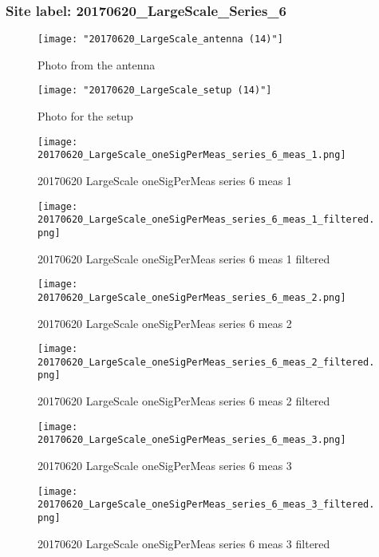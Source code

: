 \subsubsection{Site label: 20170620\_LargeScale\_Series\_6}
\begin{figure}[ht] \caption{Photo from the antenna}
\texttt{[image: "20170620\_LargeScale\_antenna (14)"]}\centering\end{figure}
\begin{figure}[ht] \caption{Photo for the setup}
\texttt{[image: "20170620\_LargeScale\_setup (14)"]}\centering\end{figure}
\begin{figure}[ht] \caption{20170620 LargeScale oneSigPerMeas series 6 meas 1}
\texttt{[image: 20170620\_LargeScale\_oneSigPerMeas\_series\_6\_meas\_1.png]}\centering\end{figure}
\begin{figure}[ht] \caption{20170620 LargeScale oneSigPerMeas series 6 meas 1 filtered}
\texttt{[image: 20170620\_LargeScale\_oneSigPerMeas\_series\_6\_meas\_1\_filtered.png]}\centering\end{figure}
\begin{figure}[ht] \caption{20170620 LargeScale oneSigPerMeas series 6 meas 2}
\texttt{[image: 20170620\_LargeScale\_oneSigPerMeas\_series\_6\_meas\_2.png]}\centering\end{figure}
\begin{figure}[ht] \caption{20170620 LargeScale oneSigPerMeas series 6 meas 2 filtered}
\texttt{[image: 20170620\_LargeScale\_oneSigPerMeas\_series\_6\_meas\_2\_filtered.png]}\centering\end{figure}
\begin{figure}[ht] \caption{20170620 LargeScale oneSigPerMeas series 6 meas 3}
\texttt{[image: 20170620\_LargeScale\_oneSigPerMeas\_series\_6\_meas\_3.png]}\centering\end{figure}
\begin{figure}[ht] \caption{20170620 LargeScale oneSigPerMeas series 6 meas 3 filtered}
\texttt{[image: 20170620\_LargeScale\_oneSigPerMeas\_series\_6\_meas\_3\_filtered.png]}\centering\end{figure}
\clearpage
